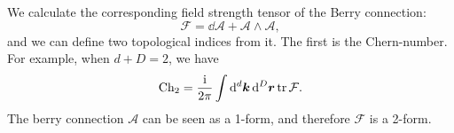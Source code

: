 \documentclass[hyperref, a4paper]{article}
\newcommand*{\ii}{\mathrm{i}}
\begin{document}
We calculate the corresponding field strength tensor of the Berry connection:
\begin{equation}
    \mathcal{F} = \dd{\mathcal{A}} + \mathcal{A} \wedge \mathcal{A},
\end{equation}
and we can define two topological indices from it. The first is the Chern-number. For example, when $d + D = 2$, 
we have 
\begin{equation}
    \text{Ch}_2 = \frac{\ii}{2\pi} \int \dd[d]{\vb*{k}} \dd[D]{\vb*{r}} \trace \mathcal{F}. 
\end{equation}
The berry connection $\mathcal{A}$ can be seen as a 1-form, and therefore $\mathcal{F}$ is a 2-form.



\end{document}
